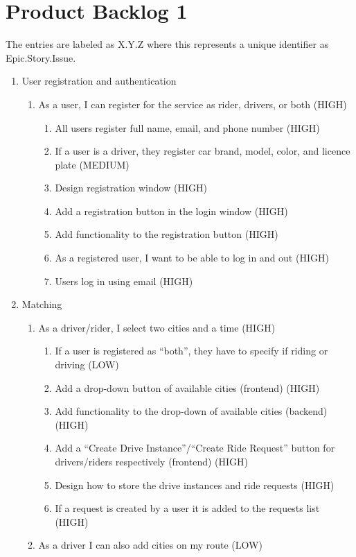 \documentclass{article}
\begin{document}
\section{Product Backlog 1}
The entries are labeled as X.Y.Z where this represents a unique identifier as Epic.Story.Issue.
\begin{enumerate}
  
  \item User registration and authentication
  \begin{enumerate}
    \item As a user, I can register for the service as rider, drivers, or both (HIGH)
    \begin{enumerate}
        \item All users register full name, email, and phone number (HIGH)
        \item If a user is a driver, they register car brand, model, color, and licence plate (MEDIUM)
        \item Design registration window (HIGH)
        \item Add a registration button in the login window (HIGH)
        \item Add functionality to the registration button (HIGH)
        \item As a registered user, I want to be able to log in and out (HIGH)
        \item Users log in using email (HIGH)
    \end{enumerate}
  \end{enumerate}
  
  \item Matching
  \begin{enumerate}
      \item As a driver/rider, I select two cities and a time (HIGH)
      \begin{enumerate}
          \item If a user is registered as “both”, they have to specify if riding or driving (LOW)
          \item Add a drop-down button of available cities (frontend) (HIGH)
          \item Add functionality to the drop-down of available cities (backend) (HIGH)
          \item Add a “Create Drive Instance”/“Create Ride Request” button for drivers/riders respectively (frontend) (HIGH)
          \item Design how to store the drive instances and ride requests (HIGH)
          \item If a request is created by a user it is added to the requests list (HIGH)
      \end{enumerate}
      \item As a driver I can also add cities on my route (LOW)
  \end{enumerate}
  

\end{enumerate}
\end{document}
